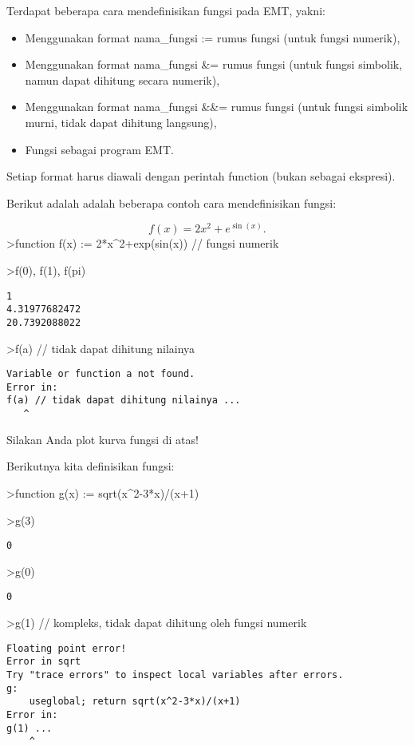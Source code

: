 \documentclass[
]{book}
\begin{document}
Terdapat beberapa cara mendefinisikan fungsi pada EMT, yakni:

\begin{itemize}
\item
  Menggunakan format nama\_fungsi := rumus fungsi (untuk fungsi numerik),
\item
  Menggunakan format nama\_fungsi \&= rumus fungsi (untuk fungsi simbolik, namun dapat dihitung secara numerik),
\item
  Menggunakan format nama\_fungsi \&\&= rumus fungsi (untuk fungsi simbolik murni, tidak dapat dihitung langsung),
\item
  Fungsi sebagai program EMT.
\end{itemize}

Setiap format harus diawali dengan perintah function (bukan sebagai ekspresi).

Berikut adalah adalah beberapa contoh cara mendefinisikan fungsi:

\[f(x)=2x^2+e^{\sin(x)}.\]\textgreater function f(x) := 2*x\^{}2+exp(sin(x)) // fungsi numerik

\textgreater f(0), f(1), f(pi)

\begin{verbatim}
1
4.31977682472
20.7392088022
\end{verbatim}

\textgreater f(a) // tidak dapat dihitung nilainya

\begin{verbatim}
Variable or function a not found.
Error in:
f(a) // tidak dapat dihitung nilainya ...
   ^
\end{verbatim}

Silakan Anda plot kurva fungsi di atas!

Berikutnya kita definisikan fungsi:

\textgreater function g(x) := sqrt(x\^{}2-3*x)/(x+1)

\textgreater g(3)

\begin{verbatim}
0
\end{verbatim}

\textgreater g(0)

\begin{verbatim}
0
\end{verbatim}

\textgreater g(1) // kompleks, tidak dapat dihitung oleh fungsi numerik

\begin{verbatim}
Floating point error!
Error in sqrt
Try "trace errors" to inspect local variables after errors.
g:
    useglobal; return sqrt(x^2-3*x)/(x+1) 
Error in:
g(1) ...
    ^
\end{verbatim}
\end{document}
